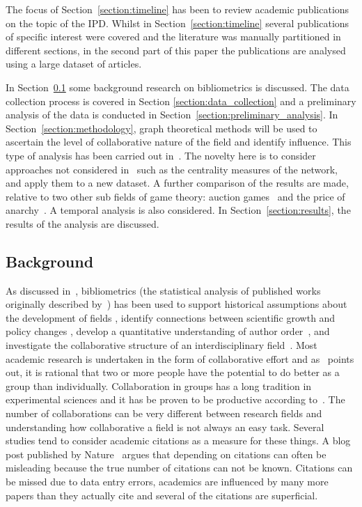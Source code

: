 \documentclass{article}
\theoremstyle{definition}
\begin{document}
The focus of Section~\ref{section:timeline} has been to review academic
publications on the topic of the IPD. Whilst in
Section~\ref{section:timeline} several publications of specific interest were
covered and the literature was manually partitioned in different sections, in
the second part of this paper the publications are analysed using a large
dataset of articles.

In Section~\ref{section:background} some background research on bibliometrics is
discussed. The data collection process is covered in Section
\ref{section:data_collection} and a preliminary analysis of the data is
conducted in Section~\ref{section:preliminary_analysis}. In
Section~\ref{section:methodology}, graph theoretical methods will be used to
ascertain the level of collaborative nature of the field and identify influence.
This type of analysis has been carried out in~\cite{Liu2015}. The novelty here
is to consider approaches not considered in~\cite{Liu2015} such as the
centrality measures of the network, and apply them to a new dataset. A further
comparison of the results are made, relative to two other sub fields of game
theory: auction games~\cite{menezes2005} and the price of
anarchy~\cite{roughgarden2005}. A temporal analysis is also considered. In
Section~\ref{section:results}, the results of the analysis are discussed.

\subsection{Background}\label{section:background}

As discussed in~\cite{youngblood2018}, bibliometrics (the statistical analysis
of published works originally described by~\cite{pritchard1969}) has been used
to support historical assumptions about the development of fields
\cite{raina1998}, identify connections between scientific growth and policy
changes \cite{das2016}, develop a quantitative understanding of author
order~\cite{sekara2018}, and investigate the collaborative structure of an
interdisciplinary field~\cite{Liu2015}. Most academic research is undertaken in
the form of collaborative effort and as~\cite{Kyvik2017} points out, it is
rational that two or more people have the potential to do better as a group
than individually. Collaboration in groups has a long tradition in experimental
sciences and it has be proven to be productive according
to~\cite{Etzkowitz1992}. The number of collaborations can be very different
between research fields and understanding how collaborative a field is not
always an easy task. Several studies tend to consider academic citations as a
measure for these things. A blog post published by Nature~\cite{nature_blog}
argues that depending on citations can often be misleading because the true
number of citations can not be known. Citations can be missed due to data entry
errors, academics are influenced by many more papers than they actually cite and
several of the citations are superficial.
\end{document}
